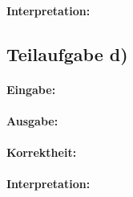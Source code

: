 \documentclass[12pt]{scrartcl}%
\theoremstyle{nonumberplain}
\begin{document}
\paragraph{Interpretation:}

\subsection*{Teilaufgabe d)}

\paragraph{Eingabe:}
\paragraph{Ausgabe:}
\paragraph{Korrektheit:}
\paragraph{Interpretation:}
\end{document}

